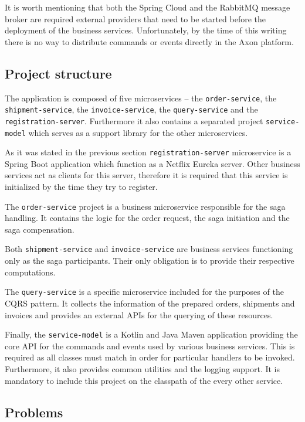 \documentclass[oneside,
  digital, %
  table,   %
  nolof,     %
  nolot,     %
]{fithesis3}
\begin{document}
It is worth mentioning that both the Spring Cloud and the RabbitMQ message broker are required external providers that need to be started before the deployment of the business services. Unfortunately, by the time of this writing there is no way to distribute commands or events directly in the Axon platform.

\subsection{Project structure}

The application is composed of five microservices -- the  \texttt{order-service}, the \texttt{shipment-service}, the \texttt{invoice-service}, the \texttt{query-service} and the \texttt{registration-server}. Furthermore it also contains a separated project \texttt{service-model} which serves as a support library for the other microservices.

As it was stated in the previous section \texttt{registration-server} microservice is a Spring Boot application which function as a Netflix Eureka server. Other business services act as clients for this server, therefore it is required that this service is initialized by the time they try to register.

The \texttt{order-service} project is a business microservice responsible for the saga handling. It contains the logic for the order request, the saga initiation and the saga compensation.

Both \texttt{shipment-service} and \texttt{invoice-service} are business services functioning only as the saga participants. Their only obligation is to provide their respective computations.

The \texttt{query-service} is a specific microservice included for the purposes of the CQRS pattern. It collects the information of the prepared orders, shipments and invoices and provides an external APIs for the querying of these resources. 

Finally, the \texttt{service-model} is a Kotlin and Java Maven application providing the core API for the commands and events used by various business services. This is required as all classes must match in order for particular handlers to be invoked. Furthermore, it also provides common utilities and the logging support. It is mandatory to include this project on the classpath of the every other service.

\subsection{Problems}
\end{document}
